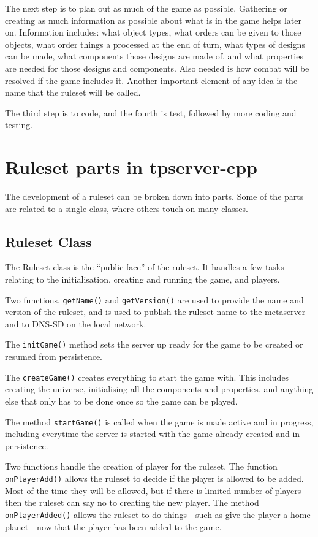\documentclass[a4paper,11pt]{report}
\begin{document}
The next step is to plan out as much of the game as possible. Gathering or creating as much information as possible about what is in the game helps later on. Information includes: what object types, what orders can be given to those objects, what order things a processed at the end of turn, what types of designs can be made, what components those designs are made of, and what properties are needed for those designs and components.  Also needed is how combat will be resolved if the game includes it.
Another important element of any idea is the name that the ruleset will be called.


The third step is to code, and the fourth is test, followed by more coding and testing.


\chapter{Ruleset parts in tpserver-cpp}
\label{chap:ruleset-parts}

The development of a ruleset can be broken down into parts. Some of the parts are related to a single class, where others touch on many classes.

\section{Ruleset Class}
\label{sec:ruleset-class}

The Ruleset class is the ``public face'' of the ruleset. It handles a few tasks relating to the initialisation, creating and running the game, and players.

Two functions, \texttt{getName()} and \texttt{getVersion()} are used to provide the name and version of the ruleset, and is used to publish the ruleset name to the metaserver and to DNS-SD on the local network.

The \texttt{initGame()} method sets the server up ready for the game to be created or resumed from persistence.

The \texttt{createGame()} creates everything to start the game with. This includes creating the universe, initialising all the components and properties, and anything else that only has to be done once so the game can be played.

The method \texttt{startGame()} is called when the game is made active and in progress, including everytime the server is started with the game already created and in persistence.

Two functions handle the creation of player for the ruleset.  The function \texttt{onPlayerAdd()} allows the ruleset to decide if the player is allowed to be added. Most of the time they will be allowed, but if there is limited number of players then the ruleset can say no to creating the new player. The method \texttt{onPlayerAdded()} allows the ruleset to do things---such as give the player a home planet---now that the player has been added to the game.
\end{document}
